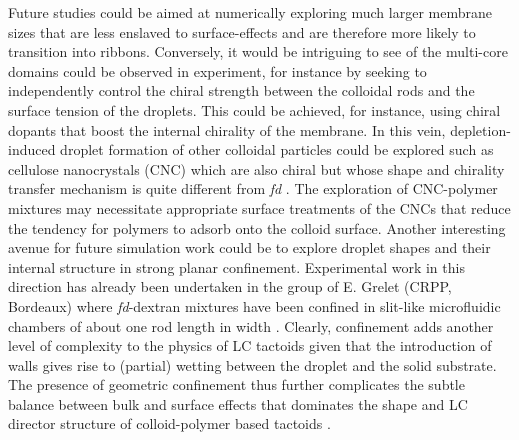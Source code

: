 Future studies could be aimed at numerically exploring much larger membrane sizes that are less enslaved to surface-effects and are therefore more likely to transition into ribbons. Conversely, it would be intriguing to see of the multi-core domains  could be observed in experiment, for instance by seeking to  independently control  the chiral strength between the colloidal rods and the surface tension of the droplets. This could be achieved, for instance, using chiral dopants that boost the internal chirality of the membrane. In this vein,  depletion-induced droplet formation of other colloidal particles could be explored such as cellulose nanocrystals (CNC) which are also chiral but whose shape and chirality transfer mechanism is quite different from {\em fd}  \cite{lagerwall2014cellulose,schutz2015rod,usov2015understanding}. The exploration of CNC-polymer mixtures may necessitate appropriate surface treatments of the CNCs that reduce the tendency for polymers to adsorb onto the colloid surface.  Another interesting avenue for future simulation work could be to explore  droplet shapes and their internal structure in strong planar confinement. Experimental work in this direction has already been undertaken in the group of E. Grelet (CRPP, Bordeaux) where {\em fd}-dextran mixtures have been confined in slit-like microfluidic chambers of about one rod length in width \cite{test1}. Clearly, confinement adds another level of complexity to the physics of LC tactoids given that the introduction of walls gives rise to (partial) wetting between the droplet and the solid substrate. The presence of geometric confinement thus further complicates the subtle balance between bulk and surface effects that dominates the shape and LC director structure of colloid-polymer based tactoids \cite{kuhnhold2022structure}.





